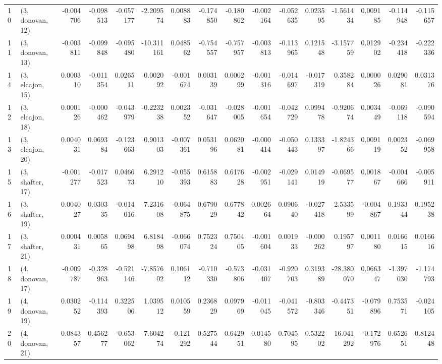 \begin{tabular}{llrrrrrrrrrrrrrr}
10 &  (3, donovan, 12) &  -0.004706 & -0.098513 & -0.057177 &  -2.209574 &  0.008883 &  -0.174850 & -0.180862 & -0.002164 & -0.052635 &  0.023595 &  -1.561434 &  0.009185 & -0.114948 & -0.115657 \\
11 &  (3, donovan, 13) &  -0.003811 & -0.099848 & -0.095480 & -10.311161 &  0.048562 &  -0.754557 & -0.757957 & -0.003813 & -0.113965 &  0.121548 &  -3.157759 &  0.012902 & -0.234418 & -0.222336 \\
14 &  (3, elcajon, 15) &   0.000310 & -0.011354 &  0.026511 &   0.002092 & -0.001674 &   0.003139 &  0.000299 & -0.001316 & -0.014697 & -0.017319 &   0.358284 &  0.000026 &  0.029081 &  0.031376 \\
12 &  (3, elcajon, 18) &   0.000126 & -0.000462 & -0.043979 &  -0.223238 &  0.002352 &  -0.031647 & -0.028005 & -0.001654 & -0.042729 &  0.099478 &  -0.920674 &  0.003449 & -0.069118 & -0.090594 \\
13 &  (3, elcajon, 20) &   0.004031 &  0.069384 & -0.123663 &   0.901303 & -0.007361 &   0.053196 &  0.062081 & -0.000414 & -0.050443 &  0.133397 &  -1.824366 &  0.009119 &  0.002352 & -0.069958 \\
15 &  (3, shafter, 17) &  -0.001277 & -0.017523 &  0.046673 &   6.291210 & -0.055393 &   0.615883 &  0.617628 & -0.002951 & -0.029141 &  0.014919 &  -0.069577 &  0.001867 & -0.004666 & -0.005911 \\
16 &  (3, shafter, 19) &   0.004027 &  0.030335 & -0.014016 &   7.231608 & -0.064875 &   0.679029 &  0.677842 &  0.002664 &  0.090640 & -0.027418 &   2.533599 & -0.004867 &  0.193344 &  0.195238 \\
17 &  (3, shafter, 21) &   0.000431 &  0.005865 &  0.069498 &   6.818498 & -0.066074 &   0.752324 &  0.750405 & -0.001604 &  0.001933 & -0.000262 &   0.195797 &  0.001180 &  0.016615 &  0.016616 \\
18 &  (4, donovan, 17) &  -0.009787 & -0.328963 & -0.521146 &  -7.857602 &  0.106112 &  -0.710330 & -0.573806 & -0.031407 & -0.920703 &  0.319389 & -28.380070 &  0.066347 & -1.397030 & -1.174793 \\
19 &  (4, donovan, 19) &   0.030252 & -0.114393 &  0.322506 &   1.039512 &  0.010559 &   0.236829 &  0.097969 & -0.011045 & -0.041572 & -0.803346 &  -0.447351 & -0.079896 &  0.753571 & -0.024105 \\
20 &  (4, donovan, 21) &   0.084357 &  0.456277 & -0.653062 &   7.604274 & -0.121292 &   0.527544 &  0.642951 &  0.014580 &  0.704595 &  0.532202 &  16.041292 & -0.172976 &  0.652651 &  0.812448 \\

\end{tabular}
